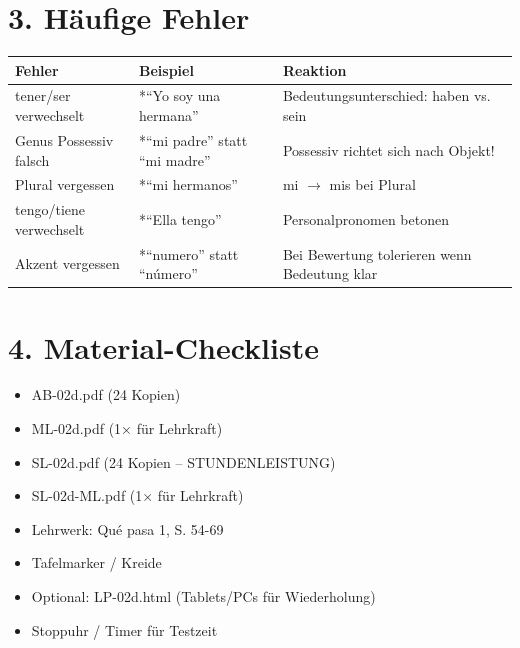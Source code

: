 \documentclass[11pt, a4paper]{article}
\newcommand{\lerngruppengroesse}{24}
\begin{document}
\section*{3. Häufige Fehler}

\begin{fehlerbox}
\begin{tabularx}{\textwidth}{|l|X|X|}
\hline
\textbf{Fehler} & \textbf{Beispiel} & \textbf{Reaktion} \\
\hline
tener/ser verwechselt & *``Yo soy una hermana'' & Bedeutungsunterschied: haben vs. sein \\
\hline
Genus Possessiv falsch & *``mi padre'' statt ``mi madre'' & Possessiv richtet sich nach Objekt! \\
\hline
Plural vergessen & *``mi hermanos'' & mi $\rightarrow$ mis bei Plural \\
\hline
tengo/tiene verwechselt & *``Ella tengo'' & Personalpronomen betonen \\
\hline
Akzent vergessen & *``numero'' statt ``número'' & Bei Bewertung tolerieren wenn Bedeutung klar \\
\hline
\end{tabularx}
\end{fehlerbox}


\section*{4. Material-Checkliste}

\begin{materialbox}
\begin{itemize}[label=$\square$]
    \item AB-02d.pdf (\lerngruppengroesse{} Kopien)
    \item ML-02d.pdf (1× für Lehrkraft)
    \item SL-02d.pdf (\lerngruppengroesse{} Kopien -- STUNDENLEISTUNG)
    \item SL-02d-ML.pdf (1× für Lehrkraft)
    \item Lehrwerk: Qué pasa 1, S. 54-69
    \item Tafelmarker / Kreide
    \item Optional: LP-02d.html (Tablets/PCs für Wiederholung)
    \item Stoppuhr / Timer für Testzeit
\end{itemize}
\end{materialbox}
\end{document}
